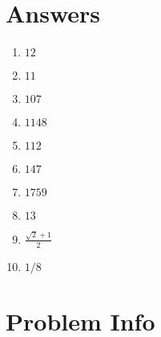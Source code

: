 \documentclass[11pt]{article}
\begin{document}
\newpage

\section{Answers}

\begin{enumerate}
 \item $12$
 \item $11$
 \item $107$
 \item $1148$
 \item $112$
 \item $147$
 \item $1759$
 \item $13$
 \item $\frac{\sqrt{2} + 1}{2}$
 \item $1/8$\end{enumerate}

\newpage

\section{Problem Info}
\end{document}

